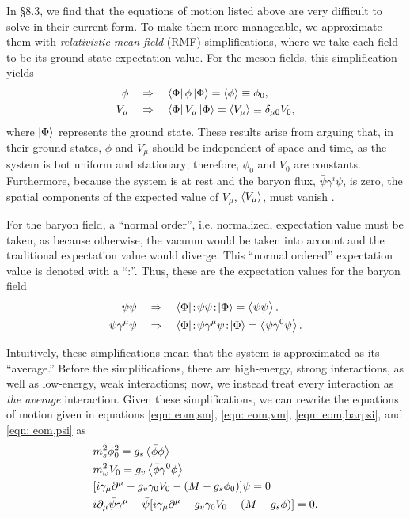 In \autocite{diener_2008} \S 8.3, we find that the equations of motion listed above are very difficult to solve in their current form. To make them more manageable, we approximate them with \textit{relativistic mean field} (RMF) simplifications, where we take each field to be its ground state expectation value. For the meson fields, this simplification yields
\begin{align}
    \phi &\quad\Rightarrow\quad \bra{\Phi} \phi \ket{\Phi} = \expval{\phi} \equiv \phi_0, \\
    V_\mu & \quad\Rightarrow\quad \bra{\Phi} V_\mu \ket{\Phi} = \expval{V_\mu} \equiv \delta_{\mu 0} V_0,
\end{align}
where $\ket{\Phi}$ represents the ground state. These results arise from arguing that, in their ground states, $\phi$ and $V_\mu$ should be independent of space and time, as the system is bot uniform and stationary; therefore, $\phi_0$ and $V_0$ are constants. Furthermore, because the system is at rest and the baryon flux, $\bar\psi\gamma^i\psi$, is zero, the spatial components of the expected value of $V_\mu$, $\expval{V_\mu}$, must vanish \autocite{diener_2008}. 

For the baryon field, a ``normal order'', i.e. normalized, expectation value must be taken, as because otherwise, the vacuum would be taken into account and the traditional expectation value would diverge. This ``normal ordered'' expectation value is denoted with a ``:''. Thus, these are the expectation values for the baryon field
\begin{align}
    \bar\psi\psi &\goesto \bra{\Phi}\!:\!\psi\psi\!:\!\ket{\Phi} = \expval{\bar\psi\psi}.\\
    \bar\psi\gamma^\mu \psi &\goesto \bra{\Phi}\!:\!\psi\gamma^\mu\psi\!:\!\ket{\Phi} = \expval{\psi\gamma^0\psi}.
\end{align}

Intuitively, these simplifications mean that the system is approximated as its ``average.'' Before the simplifications, there are high-energy, strong interactions, as well as low-energy, weak interactions; now, we instead treat every interaction as \textit{the average} interaction. Given these simplifications, we can rewrite the equations of motion given in equations \eqref{eqn: eom,sm}, \eqref{eqn: eom,vm}, \eqref{eqn: eom,barpsi}, and \eqref{eqn: eom,psi} as
\begin{align}
    & m_s^2 \phi_0^2 = g_s\expval{\bar\phi\phi}\label{eqn: qhd1, expval phi0 eom}\\
    & m_\omega^2 V_0 = g_v\expval{\bar\phi\gamma^0\phi}\label{eqn: qhd1, expval V0 eom}\\
    & \bqty{i\gamma_\mu\p^\mu - g_v\gamma_0 V_0 - (M - g_s\phi_0)}\psi = 0\\
    & i \p_\mu \bar\psi \gamma^\mu -\bar\psi\bqty{i\gamma_\mu\p^\mu - g_v \gamma_0V_0 - (M-g_s\phi)} = 0.
\end{align}

